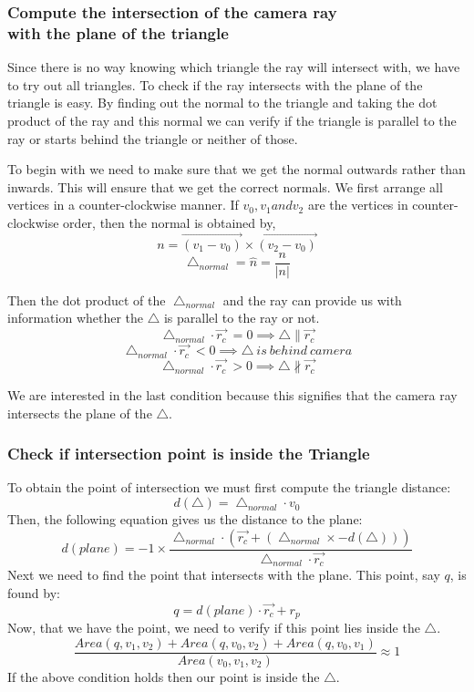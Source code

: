 \documentclass[paper=a4, fontsize=11pt]{scrartcl}
\numberwithin{equation}{section}		%
\numberwithin{figure}{section}			%
\numberwithin{table}{section}				%
\begin{document}
\subsubsection{Compute the intersection of the camera ray\\ with the plane of the triangle}
Since there is no way knowing which triangle the ray will intersect with, we have to try out all triangles.
To check if the ray intersects with the plane of the triangle is easy. By finding out the normal to the triangle and taking the dot product of the ray and this normal we can verify if the triangle is parallel to the ray or starts behind the triangle or neither of those. 
\par
To begin with we need to make sure that we get the normal outwards rather than inwards. This will ensure that we get the correct normals. We first arrange all vertices in a counter-clockwise manner. If $v_{0}, v_{1} and v_{2}$ are the vertices in counter-clockwise order, then the normal is obtained by,
\[{n} = \overrightarrow{(v_{1}-v_{0})} \times \overrightarrow{(v_{2}-v_{0})}\]
\[\bigtriangleup _{normal} = \hat{n} = \dfrac{n}{\lvert n \rvert}\]

Then the dot product of the $\bigtriangleup _{normal}$ and the ray can provide us with information whether the $\bigtriangleup$ is parallel to the ray or not.
\[ \bigtriangleup _{normal} \cdot \overrightarrow{r_{c}}\ = 0 \implies \bigtriangleup \parallel \overrightarrow{r_{c}}\]
\[ \bigtriangleup _{normal} \cdot \overrightarrow{r_{c}}\ < 0 \implies \bigtriangleup\ is\ behind\ camera \]
\[ \bigtriangleup _{normal} \cdot \overrightarrow{r_{c}}\ > 0 \implies \bigtriangleup  \not\parallel \overrightarrow{r_{c}}\]

We are interested in the last condition because this signifies that the camera ray intersects the plane of the $\bigtriangleup$.

\subsubsection{Check if intersection point is inside the Triangle}
To obtain the point of intersection we must first compute the triangle distance:
\[d(\bigtriangleup) = \bigtriangleup_{normal} \cdot v_{0}\]
Then, the following equation gives us the distance to the plane:
\[d(plane) = -1 \times \dfrac{\bigtriangleup_{normal} \cdot (\overrightarrow{r_{c}} + (\bigtriangleup_{normal} \times -d(\bigtriangleup)))}{\bigtriangleup_{normal}\cdot \overrightarrow{r_{c}}}  \]
Next we need to find the point that intersects with the plane.
This point, say $q$, is found by:
\[q = d(plane)\cdot\overrightarrow{r_{c}} + r_{p}\]
Now, that we have the point, we need to verify if this point lies inside the $\bigtriangleup$.
\[\dfrac{Area(q, v_{1}, v_{2}) + Area(q, v_{0}, v_{2}) + Area(q, v_{0}, v_{1})}{Area(v_{0}, v_{1}, v_{2})} \approx 1\]
If the above condition holds then our point is inside the $\bigtriangleup$.
\end{document}
